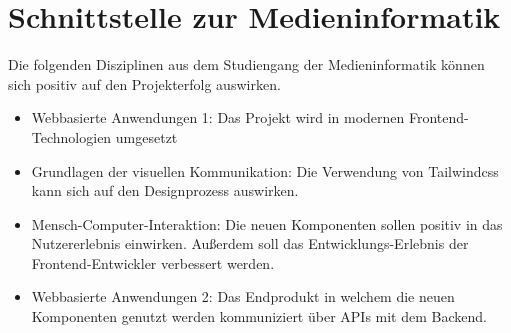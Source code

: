 \chapter{Schnittstelle zur Medieninformatik}
\label{cha:Schnittstelle zur Medieninformatik}

Die folgenden Disziplinen aus dem Studiengang der Medieninformatik können sich positiv auf den Projekterfolg auswirken.

\begin{itemize}
  \item Webbasierte Anwendungen 1: Das Projekt wird in modernen Frontend-Technologien umgesetzt
  \item Grundlagen der visuellen Kommunikation: Die Verwendung von Tailwindcss kann sich auf den Designprozess auswirken.
  \item Mensch-Computer-Interaktion: Die neuen Komponenten sollen positiv in das Nutzererlebnis einwirken. Außerdem soll das Entwicklungs-Erlebnis der Frontend-Entwickler verbessert werden.  
  \item Webbasierte Anwendungen 2: Das Endprodukt in welchem die neuen Komponenten genutzt werden kommuniziert über APIs mit dem Backend.
\end{itemize}
